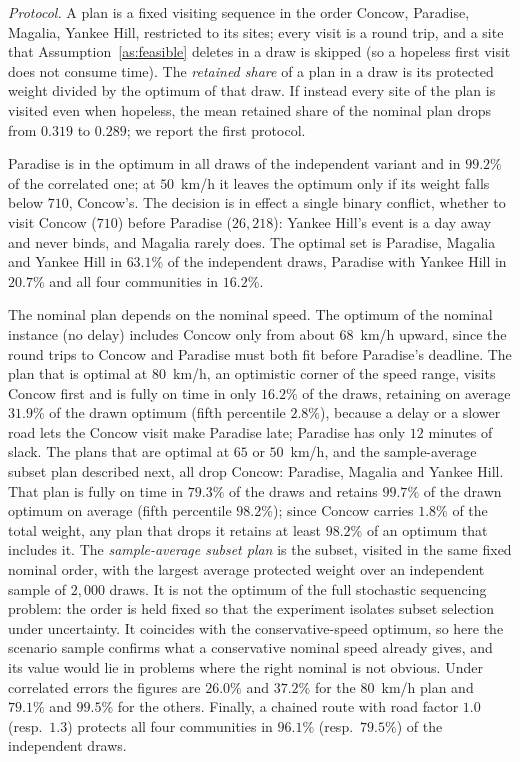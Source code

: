 \documentclass[pdflatex,sn-mathphys-ay]{sn-jnl}
\theoremstyle{thmstyleone}
\theoremstyle{thmstyletwo}
\theoremstyle{thmstylethree}
\begin{document}
\emph{Protocol.} A plan is a fixed visiting sequence in the order Concow,
Paradise, Magalia, Yankee Hill, restricted to its sites; every visit is a
round trip, and a site that Assumption~\ref{as:feasible} deletes in a
draw is skipped (so a hopeless first visit does not consume time). The
\emph{retained share} of a plan in a draw is its protected weight divided
by the optimum of that draw. If instead every site of the plan is visited
even when hopeless, the mean retained share of the nominal plan drops from
$0.319$ to $0.289$; we report the first protocol.

Paradise is in the optimum in all draws of the independent variant and in
$99.2\%$ of the correlated one; at $50$~km/h it leaves the optimum only if
its weight falls below $710$, Concow's. The decision is in effect a single
binary conflict, whether to visit Concow ($710$) before Paradise
($26{,}218$): Yankee Hill's event is a day away and never binds, and
Magalia rarely does. The optimal set is Paradise, Magalia and Yankee Hill
in $63.1\%$ of the independent draws, Paradise with Yankee Hill in
$20.7\%$ and all four communities in $16.2\%$.

The nominal plan depends on the nominal speed. The optimum of the nominal
instance (no delay) includes Concow only from about $68$~km/h upward, since
the round trips to Concow and Paradise must both fit before Paradise's
deadline. The plan that is optimal at $80$~km/h, an optimistic corner of
the speed range, visits Concow first and is fully on time in only
$16.2\%$ of the draws, retaining on average $31.9\%$ of the drawn optimum
(fifth percentile $2.8\%$), because a delay or a slower road lets the
Concow visit make Paradise late; Paradise has only $12$ minutes of slack.
The plans that are optimal at $65$ or $50$~km/h, and the sample-average
subset plan described next, all drop Concow: Paradise, Magalia and Yankee Hill.
That plan is fully on time in $79.3\%$ of the draws and retains $99.7\%$
of the drawn optimum on average (fifth percentile $98.2\%$); since Concow
carries $1.8\%$ of the total weight, any plan that drops it retains at
least $98.2\%$ of an optimum that includes it. The \emph{sample-average
subset plan} is the subset, visited in the same fixed nominal order, with the
largest average protected weight over an independent sample of $2{,}000$
draws. It is not the optimum of the full stochastic sequencing problem: the
order is held fixed so that the experiment isolates subset selection under
uncertainty. It coincides with the conservative-speed optimum, so here the scenario
sample confirms what a conservative nominal speed already gives, and its
value would lie in problems where the right nominal is not obvious. Under
correlated errors the figures are $26.0\%$ and $37.2\%$ for the
$80$~km/h plan and $79.1\%$ and $99.5\%$ for the others. Finally, a
chained route with road factor $1.0$ (resp.\ $1.3$) protects all four
communities in $96.1\%$ (resp.\ $79.5\%$) of the independent draws.
\end{document}
